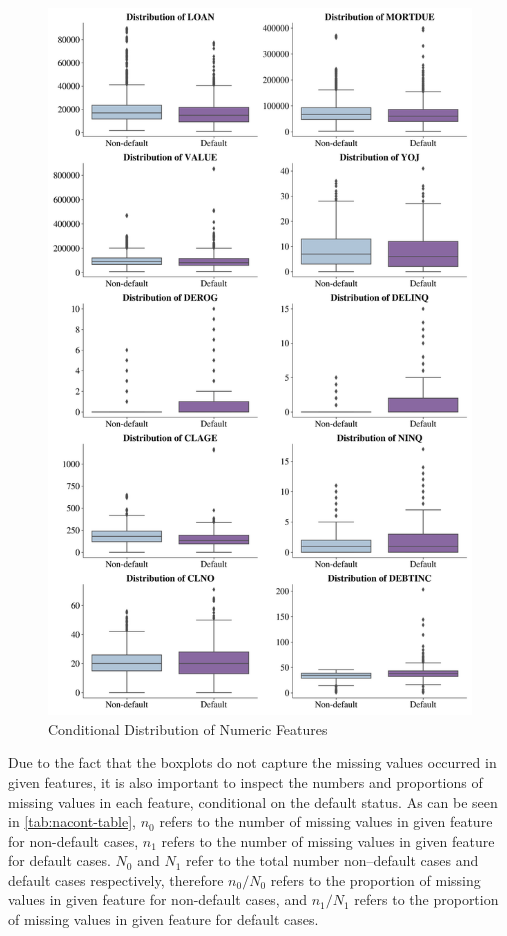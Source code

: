 \begin{figure}[H]
\centering
\caption{Conditional Distribution of Numeric Features}\vspace{0.5em}
\label{fig:boxfeat}
\includegraphics[width=140mm]{Figures/Numeric_Features_Distribution_Boxplots.jpg}
\vspace{-1em}
\end{figure}

Due to the fact that the boxplots do not capture the missing values occurred in given features, it is also important to inspect the numbers and proportions of missing values in each feature, conditional on the default status.
As can be seen in \autoref{tab:nacont-table}, $n_0$ refers to the number of missing values in given feature for non-default cases, $n_1$ refers to the number of missing values in given feature for default cases.
$N_0$ and $N_1$ refer to the total number non--default cases and default cases respectively, therefore $n_0/N_0$ refers to the proportion of missing values in given feature for non-default cases, and $n_1/N_1$ refers to the proportion of missing values in given feature for default cases.

